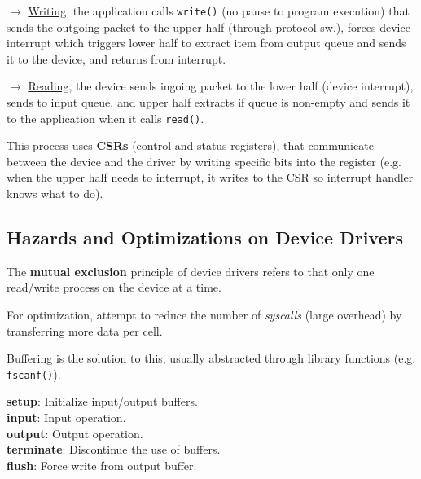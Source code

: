 \documentclass[11pt]{article}
\begin{document}
$\rightarrow$ \underline{Writing}, the application calls \texttt{write()} (no pause to program execution) that sends the outgoing packet to the upper half (through protocol sw.), forces device interrupt which triggers lower half to extract item from output queue and sends it to the device, and returns from interrupt.

$\rightarrow$ \underline{Reading}, the device sends ingoing packet to the lower half (device interrupt), sends to input queue, and upper half extracts if queue is non-empty and sends it to the application when it calls \texttt{read()}.

This process uses \textbf{CSRs} (control and status registers), that communicate between the device and the driver by writing specific bits into the register (e.g. when the upper half needs to interrupt, it writes to the CSR so interrupt handler knows what to do).

\subsection*{Hazards and Optimizations on Device Drivers}

The \textbf{mutual exclusion} principle of device drivers refers to that only one read/write process on the device at a time.

For optimization, attempt to reduce the number of \textit{syscalls} (large overhead) by transferring more data per cell.

Buffering is the solution to this, usually abstracted through library functions (e.g. \texttt{fscanf()}).

\begin{tcolorbox}[
    enhanced,
    attach boxed title to top left={xshift=6mm,yshift=-1.5mm},
    colback=moonstoneblue!20,
    colframe=moonstoneblue,
    colbacktitle=moonstoneblue,
    title=Operations used for Buffering,
    fonttitle=\bfseries\color{white},
    boxed title style={size=small,colframe=moonstoneblue,sharp corners},
    sharp corners,
    label=box:logic-types,
]
    {\color{moondark}\textbf{setup}}: Initialize input/output buffers. \\
    {\color{moondark}\textbf{input}}: Input operation. \\
    {\color{moondark}\textbf{output}}: Output operation. \\
    {\color{moondark}\textbf{terminate}}: Discontinue the use of buffers. \\
    {\color{moondark}\textbf{flush}}: Force write from output buffer.
\end{tcolorbox}
\end{document}
